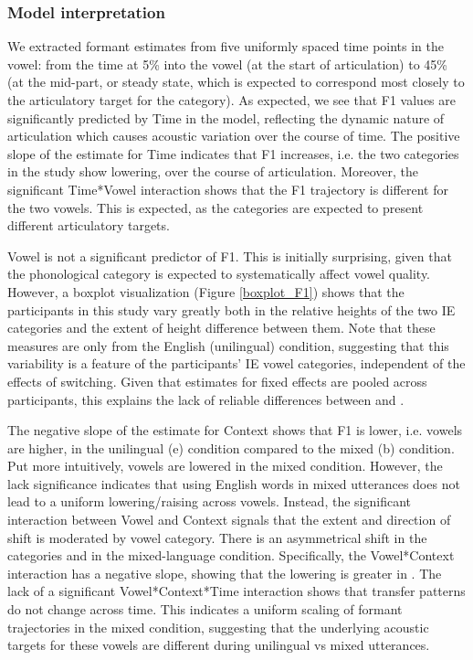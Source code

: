 \documentclass[12 pt]{article}
\newcommand{\nt}[1]{\textipa{[#1]}} %
\begin{document}
\subsubsection*{Model interpretation}
We extracted formant estimates from five uniformly spaced time points in the vowel: from the time at 5\% into the vowel (at the start of articulation) to 45\% (at the mid-part, or steady state, which is expected to correspond most closely to the articulatory target for the category). As expected, we see that F1 values are significantly predicted by Time in the model, reflecting the dynamic nature of articulation which causes acoustic variation over the course of time. The positive slope of the estimate for Time indicates that F1 increases, i.e. the two categories in the study show lowering, over the course of articulation. Moreover, the significant Time*Vowel interaction shows that the F1 trajectory is different for the two vowels. This is expected, as the categories are expected to present different articulatory targets.  

Vowel is not a significant predictor of F1. This is initially surprising, given that the phonological category is expected to systematically affect vowel quality. However, a boxplot visualization (Figure \ref{boxplot_F1}) shows that the participants in this study vary greatly both in the relative heights of the two IE categories \nt{2, \ae} and the extent of height difference between them. Note that these measures are only from the English (unilingual) condition, suggesting that this variability is a feature of the participants' IE vowel categories, independent of the effects of switching. Given that estimates for fixed effects are pooled across participants, this explains the lack of reliable differences between \nt{2} and \nt{\ae}. 
 
The negative slope of the estimate for Context shows that F1 is lower, i.e. vowels are higher, in the unilingual (e) condition compared to the mixed (b) condition. Put more intuitively, vowels are lowered in the mixed condition. However, the lack significance indicates that using English words in mixed utterances does not lead to a uniform lowering/raising across vowels. Instead, the significant interaction between Vowel and Context signals that the extent and direction of shift is moderated by vowel category. There is an asymmetrical shift in the categories \nt{2} and \nt{\ae} in the mixed-language condition. Specifically, the Vowel*Context interaction has a negative slope, showing that the lowering is greater in \nt{2}. The lack of a significant Vowel*Context*Time interaction shows that transfer patterns do not change across time. This indicates a uniform scaling of formant trajectories in the mixed condition, suggesting that the underlying acoustic targets for these vowels are different during unilingual vs mixed utterances. 
 
\end{document}
